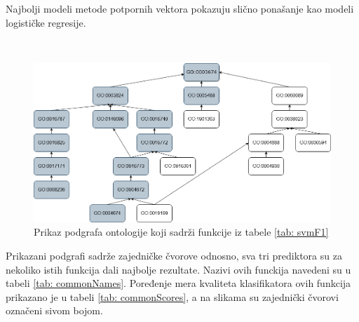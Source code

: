 ~\\
~\\

Najbolji modeli metode potpornih vektora pokazuju slično ponašanje kao modeli logističke regresije.

~\\

\begin{figure}[H]
	\centering
	\includegraphics[width=\textwidth]{Figures/SVMo.png}
	\caption{Prikaz podgrafa ontologije koji sadrži funkcije iz tabele \ref{tab: svmF1}}
	\label{fig:svm_ontology}
\end{figure}

\newpage

Prikazani podgrafi sadrže zajedničke čvorove odnosno, sva tri prediktora su za nekoliko istih funkcija dali najbolje rezultate. Nazivi ovih funckija navedeni su u tabeli \ref{tab: commonNames}. Poređenje mera kvaliteta klasifikatora ovih funkcija prikazano je u tabeli \ref{tab: commonScores}, a na slikama su zajednički čvorovi označeni sivom bojom.

~\\

